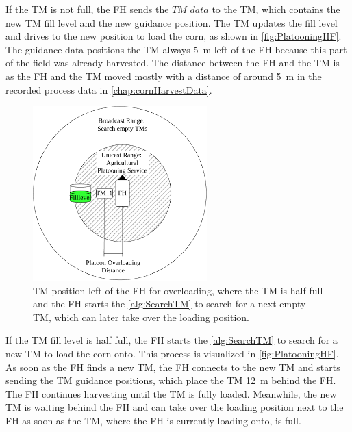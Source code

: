 If the \ac{TM} is not full, the \ac{FH} sends the $TM\_data$ to the \ac{TM},
which contains the new \ac{TM} fill level and the new guidance position.
The \ac{TM} updates the fill level and drives to the new position to load the corn, as shown in \autoref{fig:PlatooningHF}.
The guidance data positions the \ac{TM} always \SI{5}{\metre} left of the \ac{FH} because this part of the field was already harvested.
The distance between the \ac{FH} and the \ac{TM} is  as the \ac{FH} and the \ac{TM} moved mostly with a distance of around \SI{5}{\metre} in
the recorded process data in \autoref{chap:cornHarvestData}.

\begin{figure}[]%
	\centering
	\includegraphics[width=0.6\textwidth]{figures/platoonHALF}
	\caption{\acf{TM} position left of the \acf{FH} for overloading, where the \ac{TM} is half full and the
		\ac{FH} starts the \autoref{alg:SearchTM} to search for a next empty \ac{TM},
		which can later take over the loading position.}
	\label{fig:PlatooningHF}%
\end{figure}
If the \ac{TM} fill level is half full, the \ac{FH} starts the \autoref{alg:SearchTM}
to search for a new \ac{TM} to load the corn onto.
This process is visualized in \autoref{fig:PlatooningHF}.
As soon as the \ac{FH} finds a new \ac{TM}, the \ac{FH} connects to the new \ac{TM} and starts sending
the \ac{TM} guidance positions, which place the \ac{TM} \SI{12}{\metre} behind the \ac{FH}.
The \ac{FH} continues harvesting until the \ac{TM} is fully loaded.
Meanwhile, the new \ac{TM} is waiting behind the \ac{FH} and can take over the loading position next to the \ac{FH} as
soon as the \ac{TM}, where the \ac{FH} is currently loading onto, is full.

